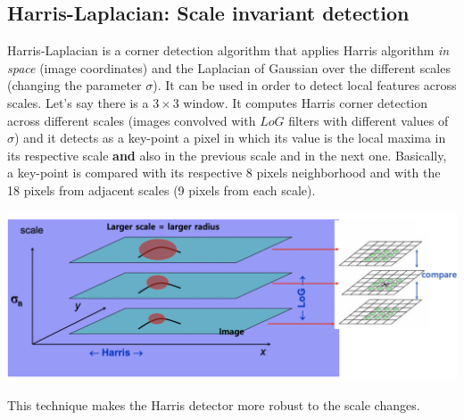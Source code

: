 \subsection{Harris-Laplacian: Scale invariant detection}
Harris-Laplacian is a corner detection algorithm that applies Harris algorithm \textit{in space} (image coordinates) and the Laplacian of Gaussian over the different scales (changing the parameter $\sigma$). It can be used in order to detect local features across scales. \newline\newline
Let's say there is a $3 \times 3$ window. It computes Harris corner detection across different scales (images convolved with $LoG$ filters with different values of $\sigma$) and it detects as a key-point a pixel in which its value is the local maxima in its respective scale \textbf{and} also in the previous scale and in the next one. Basically, a key-point is compared with its respective 8 pixels neighborhood and with the 18 pixels from adjacent scales (9 pixels from each scale).
\begin{center}
    \includegraphics[scale = 0.3]{images/Harris-LoG.png}
\end{center}
This technique makes the Harris detector more robust to the scale changes.

